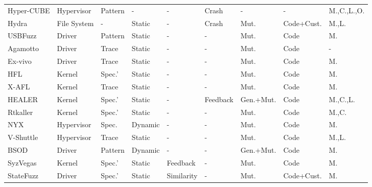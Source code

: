 \begin{footnotesize}
\begin{longtable}{m{1.8cm}m{1.3cm}m{0.6cm}m{1.6cm}m{1.0cm}m{0.8cm}m{0.9cm}m{1.3cm}m{0.5cm}}
        Hyper-CUBE\cite{schumilo2020hyper} & Hypervisor & Pattern & - & - & Crash & - & - & M.,C.,L.,O. \\
        
        Hydra\cite{Hydra2020finding} & File System & - & Static & - & Crash & Mut. & Code+Cust. & M.,L. \\
        
        USBFuzz\cite{peng2020usbfuzz} & Driver & Pattern & Static & - & - & Mut. & Code & M. \\
        
        Agamotto\cite{song2020agamotto} & Driver & Trace & Static & - & - & Mut. & Code & - \\

        Ex-vivo\cite{Pustogarov2020ExvivoDA} & Driver & Trace & Static & - & - & Mut. & Code & M. \\
        
        HFL\cite{kim2020hfl} & Kernel & Spec.' & Static & - & - & Mut. & Code & M. \\
        
        X-AFL\cite{liang2020xafl} & Kernel & Trace & Static & - & - & Mut. & Code & M. \\
        
        HEALER\cite{sun2021healer} & Kernel & Spec.' & Static & - & Feedback & Gen.+Mut. & Code & M.,C.,L. \\
        
        Rtkaller\cite{shen2021rtkaller} & Kernel & Spec.' & Static & - & - & Mut. & Code & M.,C. \\
        
        NYX\cite{schumilo2021nyx} & Hypervisor & Spec. & Dynamic & - & - & Mut. & Code & M. \\
        
        V-Shuttle\cite{pan2021V-shuttle} & Hypervisor & Trace & Static & - & - & Mut. & Code & M.,L. \\
        
        BSOD\cite{maier2021bsod} & Driver & Pattern & Dynamic & - & - & Gen.+Mut. & Code & M. \\
        
        SyzVegas\cite{wang2021syzvegas} & Kernel & Spec.' & Static & Feedback & - & Mut. & Code & M. \\
        
        StateFuzz\cite{zhao2022statefuzz} & Driver & Spec.' & Static & Similarity & - & Mut. & Code+Cust. & M. \\
        

\end{longtable}
\end{footnotesize}
